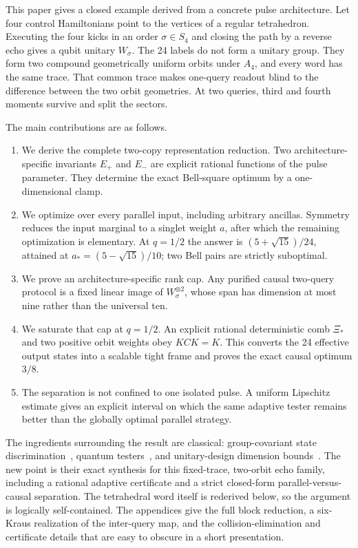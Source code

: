 \documentclass[11pt]{article}
\theoremstyle{definition}
\begin{document}
This paper gives a closed example derived from a concrete pulse architecture.
Let four control Hamiltonians point to the vertices of a regular tetrahedron.
Executing the four kicks in an order $\sigma\in S_4$ and closing the path by a
reverse echo gives a qubit unitary $W_\sigma$.  The 24 labels do not form a
unitary group.  They form two compound geometrically uniform orbits under
$A_4$, and every word has the same trace.  That common trace makes one-query
readout blind to the difference between the two orbit geometries.  At two
queries, third and fourth moments survive and split the sectors.

The main contributions are as follows.
\begin{enumerate}
\item We derive the complete two-copy representation reduction.  Two
  architecture-specific invariants $E_+$ and $E_-$ are explicit rational
  functions of the pulse parameter.  They determine the exact Bell-square
  optimum by a one-dimensional clamp.
\item We optimize over every parallel input, including arbitrary ancillas.
  Symmetry reduces the input marginal to a singlet weight $a$, after which the
  remaining optimization is elementary.  At $q=1/2$ the answer is
  $(5+\sqrt{15})/24$, attained at
  $a_*=(5-\sqrt{15})/10$; two Bell pairs are strictly suboptimal.
\item We prove an architecture-specific rank cap.  Any purified causal
  two-query protocol is a fixed linear image of $W_\sigma^{\otimes2}$, whose
  span has dimension at most nine rather than the universal ten.
\item We saturate that cap at $q=1/2$.  An explicit rational deterministic
  comb $\Xi_*$ and two positive orbit weights obey $KCK=K$.  This converts the
  24 effective output states into a scalable tight frame and proves the exact
  causal optimum $3/8$.
\item The separation is not confined to one isolated pulse.  A uniform
  Lipschitz estimate gives an explicit interval on which the same adaptive
  tester remains better than the globally optimal parallel strategy.
\end{enumerate}

The ingredients surrounding the result are classical: group-covariant state
discrimination~\cite{eldarforney2001,eldarmegretski2004,krovi2015}, quantum
testers~\cite{chiribella2008,jencova2016}, and unitary-design dimension
bounds~\cite{gross2007,bavaresco2022}.  The new point is their exact synthesis
for this fixed-trace, two-orbit echo family, including a rational adaptive
certificate and a strict closed-form parallel-versus-causal separation.  The
tetrahedral word itself is rederived below, so the argument is logically
self-contained.  The appendices give the full block reduction, a six-Kraus
realization of the inter-query map, and the collision-elimination and
certificate details that are easy to obscure in a short presentation.
\end{document}
